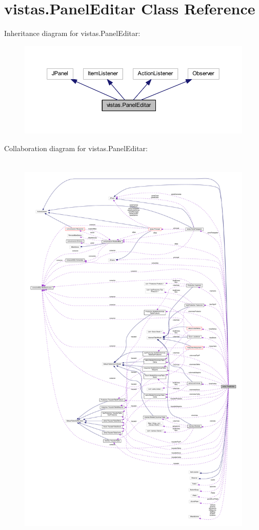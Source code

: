 \hypertarget{classvistas_1_1_panel_editar}{}\section{vistas.\+Panel\+Editar Class Reference}
\label{classvistas_1_1_panel_editar}


Inheritance diagram for vistas.\+Panel\+Editar\+:
\nopagebreak
\begin{figure}[H]
\begin{center}
\leavevmode
\includegraphics[width=350pt]{classvistas_1_1_panel_editar__inherit__graph}
\end{center}
\end{figure}


Collaboration diagram for vistas.\+Panel\+Editar\+:
\nopagebreak
\begin{figure}[H]
\begin{center}
\leavevmode
\includegraphics[height=550pt]{classvistas_1_1_panel_editar__coll__graph}
\end{center}
\end{figure}
